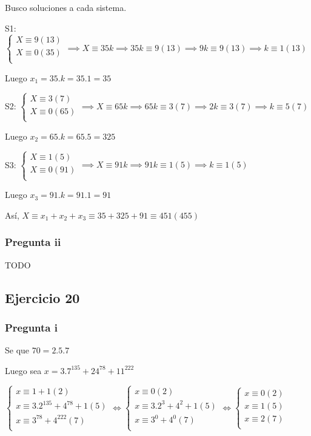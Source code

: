 Busco soluciones a cada sistema.

S1: $ \begin{cases}
    X \equiv 9(13) \\
    X \equiv 0(35) \\
\end{cases} \implies X \equiv 35k \implies 35k \equiv 9(13) \implies 9k\equiv 9(13) \implies k \equiv 1(13) $

Luego $ x_1 = 35.k = 35.1 = 35 $

S2: $ \begin{cases}
    X \equiv 3(7) \\
    X \equiv 0(65) \\
\end{cases} \implies X \equiv 65k \implies 65k \equiv 3(7) \implies 2k \equiv 3(7) \implies k \equiv 5(7) $

Luego $ x_2 = 65.k = 65.5 = 325 $

S3: $ \begin{cases}
    X \equiv 1(5) \\
    X \equiv 0(91) \\
\end{cases} \implies X \equiv 91k \implies 91k \equiv 1(5) \implies k \equiv 1(5) $

Luego $ x_3 = 91.k = 91.1 = 91 $

Así, $ X \equiv x_1 + x_2 + x_3 \equiv 35+325+91 \equiv 451(455) $

\subsubsection{Pregunta ii}
TODO

\subsection{Ejercicio 20}

\subsubsection{Pregunta i}

Se que $ 70 = 2.5.7 $

Luego sea $x = 3.7^{135} + 24^{78} + 11^{222} $

$ \begin{cases}
    x \equiv 1+1(2) \\
    x \equiv 3.2^{135}+4^{78} + 1(5) \\
    x \equiv 3^{78}+4^{222}(7) \\
\end{cases} 
\iff \begin{cases}
    x \equiv 0(2) \\
    x \equiv 3.2^{3}+4^{2} + 1(5) \\
    x \equiv 3^{0}+4^{0}(7) \\
\end{cases}
\iff \begin{cases}
    x \equiv 0(2) \\
    x \equiv 1(5) \\
    x \equiv 2(7) \\
\end{cases} $

